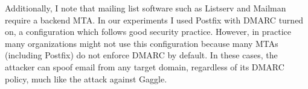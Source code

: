 
Additionally, I note that mailing list software such as Listserv and
Mailman require a backend MTA.  In our experiments I used Postfix
with DMARC turned on, a configuration which follows good security
practice.  However, in practice many organizations might not use this
configuration because many MTAs (including Postfix) do not enforce
DMARC by default.  In these cases, the attacker can spoof email from any
target domain, regardless of its DMARC policy, much like the attack
against Gaggle.


